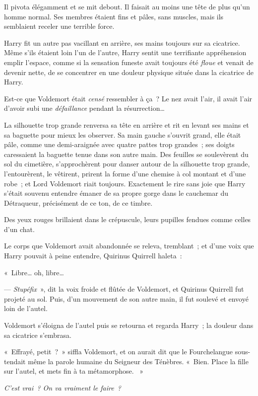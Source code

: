 Il pivota élégamment et se mit debout.
Il faisait au moins une tête de plus qu'un homme normal.
Ses membres étaient fins et pâles, sans muscles, mais ils semblaient receler une terrible force.

Harry fit un autre pas vacillant en arrière, ses mains toujours sur sa cicatrice.
Même s'ils étaient loin l'un de l'autre, Harry sentit une terrifiante appréhension emplir l'espace, comme si la sensation funeste avait toujours été \emph{floue} et venait de devenir nette, de se concentrer en une douleur physique située dans la cicatrice de Harry.

Est-ce que Voldemort était \emph{censé} ressembler à ça~?
Le nez avait l'air, il avait l'air d'avoir subi une \emph{défaillance} pendant la résurrection…

La silhouette trop grande renversa sa tête en arrière et rit en levant ses mains et sa baguette pour mieux les observer.
Sa main gauche s'ouvrit grand, elle était pâle, comme une demi-araignée avec quatre pattes trop grandes~; ses doigts caressaient la baguette tenue dans son autre main.
Des feuilles se soulevèrent du sol du cimetière, s'approchèrent pour danser autour de la silhouette trop grande, l'entourèrent, le vêtirent, prirent la forme d'une chemise à col montant et d'une robe~; et Lord Voldemort riait toujours.
Exactement le rire sans joie que Harry s'était souvenu entendre émaner de sa propre gorge dans le cauchemar du Détraqueur, précisément de ce ton, de ce timbre.

Des yeux rouges brillaient dans le crépuscule, leurs pupilles fendues comme celles d'un chat.

Le corps que Voldemort avait abandonnée se releva, tremblant~; et d'une voix que Harry pouvait à peine entendre, Quirinus Quirrell haleta~:

«~Libre… oh, libre…

--- \emph{Stupéfix}~», dit la voix froide et flûtée de Voldemort, et Quirinus Quirrell fut projeté au sol.
Puis, d'un mouvement de son autre main, il fut soulevé et envoyé loin de l'autel.

Voldemort s'éloigna de l'autel puis se retourna et regarda Harry~; la douleur dans sa cicatrice s'embrasa.

«~Effrayé, petit~?~»
siffla Voldemort, et on aurait dit que le Fourchelangue sous-tendait même la parole humaine du Seigneur des Ténèbres.
«~Bien. Place la fille sur l'autel, et mets fin à ta métamorphose.
~»

\emph{C'est vrai~?
On va vraiment le faire~?}

